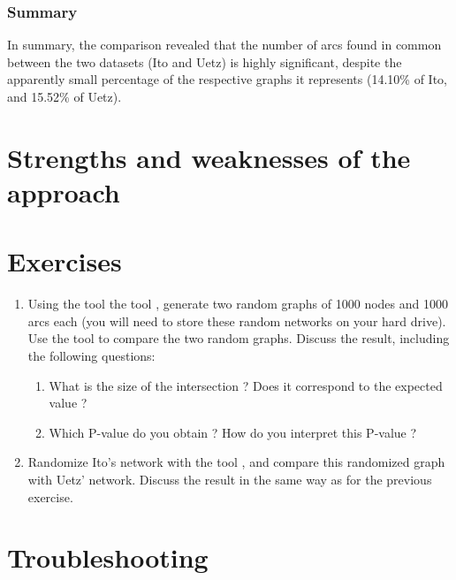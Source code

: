 \subsubsection{Summary}

In summary, the comparison revealed that the number of arcs found in
common between the two datasets (Ito and Uetz) is highly significant,
despite the apparently small percentage of the respective graphs it
represents (14.10\% of Ito, and 15.52\% of Uetz).

\section{Strengths and weaknesses of the approach}



\section{Exercises}

\begin{enumerate}

\item Using the tool the tool ,
  generate two random graphs of 1000 nodes and 1000 arcs each (you
  will need to store these random networks on your hard drive).  Use
  the tool  to compare the two random
  graphs.
  Discuss the result, including the following questions: 
  \begin{enumerate}
  \item What is the size of the intersection ? Does it correspond to
    the expected value ? 
  \item Which P-value do you obtain ? How do you interpret this P-value ? 
  \end{enumerate}

\item Randomize Ito's network with the tool , and compare this randomized graph with Uetz'
  network. Discuss the result in the same way as for the previous
  exercise.

\end{enumerate}

\section{Troubleshooting}

